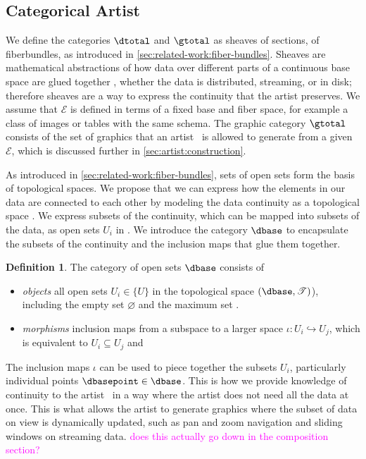\documentclass[10pt,journal,compsoc]{IEEEtran}
\newcommand{\note}[1]{\textcolor{magenta}{#1}}
\theoremstyle{definition}
\newtheorem{definition}{Definition}[section]
\theoremstyle{remark}
\begin{document}
\subsection{Categorical Artist}
\label{sec:artist:category}
We define the categories $\mathcal{\dtotal}$ and $\mathcal{\gtotal}$ as sheaves of sections\cite{SheafMathematics2021,spanier1989algebraic}, of fiberbundles, as introduced in \autoref{sec:related-work:fiber-bundles}. Sheaves are mathematical abstractions of how data over different parts of a continuous base space are glued together \cite{ghristElementaryAppliedTopology2014, ghri}, whether the data is distributed, streaming, or in disk; therefore sheaves are a way to express the continuity that the artist preserves. 
We assume that $\mathcal{E}$ is defined in terms of a fixed base and fiber space, for example a class of images or tables with the same schema. The graphic category $\mathcal{\gtotal}$ consists of the set of graphics that an artist \vartist\ is allowed to generate from a given $\mathcal{E}$, which is discussed further in \autoref{sec:artist:construction}.

As introduced in \autoref{sec:related-work:fiber-bundles}, sets of open sets form the basis of topological spaces. We propose that we can express how the elements in our data are connected to each other by modeling the data continuity as a topological space \dbase. We express subsets of the continuity, which can be mapped into subsets of the data, as open sets $U_{i}$ in \dbase. We introduce the category $\mathcal{\dbase}$ to encapsulate the subsets of the continuity and the inclusion maps that glue them together. 

\begin{definition} The category of open sets $\mathcal{\dbase}$ consists of
  \label{def:category:K} 
  \begin{itemize}
    \item \textit{objects} all open sets $U_{i} \in \{U\}$ in the topological space $(\dbase, \mathscr{T})$), including the empty set $\varnothing$ and the maximum set \dbase. 
    \item \textit{morphisms} inclusion maps from a subspace to a larger space $\iota: U_{i} \hookrightarrow U_{j}$, which is equivalent to $U_{i} \subseteq U_{j}$ and  
  \end{itemize} 
\end{definition}

The inclusion maps $\iota$ can be used to piece together the subsets $U_{i}$, particularly individual points $\dbasepoint \in \dbase$. This is how we provide knowledge of continuity to the artist \vartist\ in a way where the artist does not need all the data at once. This is what allows the artist to generate graphics where the subset of data on view is dynamically updated, such as pan and zoom navigation\cite{NekrasovskiEvaluationPanZoom2006} and sliding windows on streaming data\cite{crouchDynamicGraphsSlidingwindow2013,chuTimeSeriesSegmentation1995}. \note{does this actually go down in the composition section?}
\end{document}
